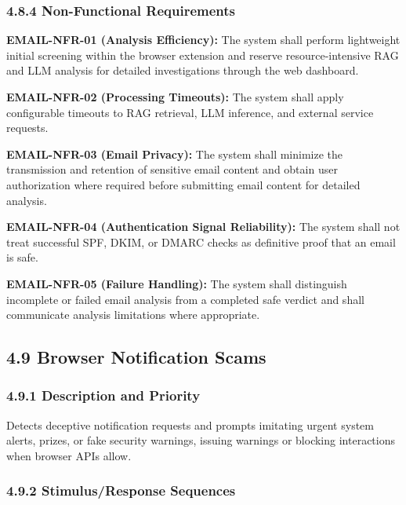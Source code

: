 \documentclass[12pt,a4paper]{report}
\let\originaladdcontentsline\addcontentsline
\renewcommand{\addcontentsline}[3]{\phantomsection\originaladdcontentsline{#1}{#2}{#3}}
\begin{document}
\subsubsection*{4.8.4 Non-Functional Requirements}

\textbf{EMAIL-NFR-01 (Analysis Efficiency):} The system shall perform lightweight initial screening within the browser extension and reserve resource-intensive RAG and LLM analysis for detailed investigations through the web dashboard.\par

\textbf{EMAIL-NFR-02 (Processing Timeouts):} The system shall apply configurable timeouts to RAG retrieval, LLM inference, and external service requests.\par

\textbf{EMAIL-NFR-03 (Email Privacy):} The system shall minimize the transmission and retention of sensitive email content and obtain user authorization where required before submitting email content for detailed analysis.\par

\textbf{EMAIL-NFR-04 (Authentication Signal Reliability):} The system shall not treat successful SPF, DKIM, or DMARC checks as definitive proof that an email is safe.\par

\textbf{EMAIL-NFR-05 (Failure Handling):} The system shall distinguish incomplete or failed email analysis from a completed safe verdict and shall communicate analysis limitations where appropriate.\par

\subsection*{4.9 Browser Notification Scams}

\subsubsection*{4.9.1 Description and Priority}

Detects deceptive notification requests and prompts imitating urgent system alerts, prizes, or fake security warnings, issuing warnings or blocking interactions when browser APIs allow.\par

\subsubsection*{4.9.2 Stimulus/Response Sequences}
\end{document}
